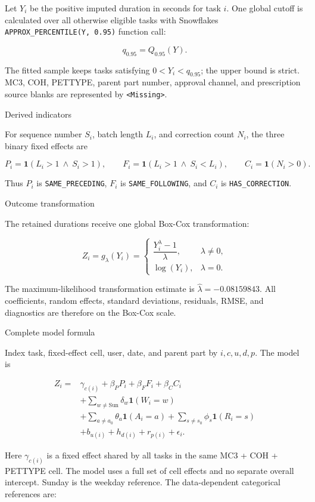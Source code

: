 \documentclass[
]{article}
\begin{document}
Let \(Y_i\) be the positive imputed duration in seconds for task \(i\).
One global cutoff is calculated over all otherwise eligible tasks with
Snowflake\textquotesingle s \texttt{APPROX\_PERCENTILE(Y,\ 0.95)}
function call:

\[
q_{0.95}=Q_{0.95}(Y).
\]

The fitted sample keeps tasks satisfying \(0<Y_i<q_{0.95}\); the upper
bound is strict. MC3, COH, PETTYPE, parent part number, approval
channel, and prescription source blanks are represented by
\texttt{\textless{}Missing\textgreater{}}.

Derived indicators

For sequence number \(S_i\), batch length \(L_i\), and correction count
\(N_i\), the three binary fixed effects are

\[
P_i=\mathbf{1}(L_i>1\ \land\ S_i>1),
\qquad
F_i=\mathbf{1}(L_i>1\ \land\ S_i<L_i),
\qquad
C_i=\mathbf{1}(N_i>0).
\]

Thus \(P_i\) is \texttt{SAME\_PRECEDING}, \(F_i\) is
\texttt{SAME\_FOLLOWING}, and \(C_i\) is \texttt{HAS\_CORRECTION}.

Outcome transformation

The retained durations receive one global Box-Cox transformation:

\[
Z_i=g_\lambda(Y_i)=
\begin{cases}
\dfrac{Y_i^\lambda-1}{\lambda}, & \lambda\ne0,\\
\log(Y_i), & \lambda=0.
\end{cases}
\]

The maximum-likelihood transformation estimate is
\(\widehat{\lambda}=-0.08159843\). All coefficients, random effects,
standard deviations, residuals, RMSE, and diagnostics are therefore on
the Box-Cox scale.

Complete model formula

Index task, fixed-effect cell, user, date, and parent part by
\(i, c, u, d, p\). The model is

\[
\begin{aligned}
Z_i={}&\gamma_{c(i)}+\beta_P P_i+\beta_F F_i+\beta_C C_i\\
&+\sum_{w\ne\mathrm{Sun}}\delta_w\mathbf{1}(W_i=w)\\
&+\sum_{a\ne a_0}\theta_a\mathbf{1}(A_i=a)
+\sum_{s\ne s_0}\phi_s\mathbf{1}(R_i=s)\\
&+b_{u(i)}+h_{d(i)}+r_{p(i)}+\epsilon_i.
\end{aligned}
\]

Here \(\gamma_{c(i)}\) is a fixed effect shared by all tasks in the same
MC3 + COH + PETTYPE cell. The model uses a full set of cell effects and
no separate overall intercept. Sunday is the weekday reference. The
data-dependent categorical references are:
\end{document}
